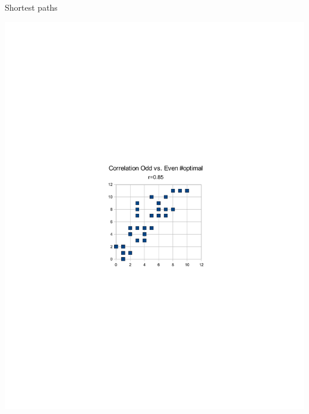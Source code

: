 \documentclass[xcolor=table,handout]{beamer}
\begin{document}
\begin{frame}{Shortest paths}
\centerline{
 \includegraphics[trim= 10cm 10cm 10cm 10cm,height=.9\textheight]{numbershortest.pdf}}
\end{frame}
\end{document}
